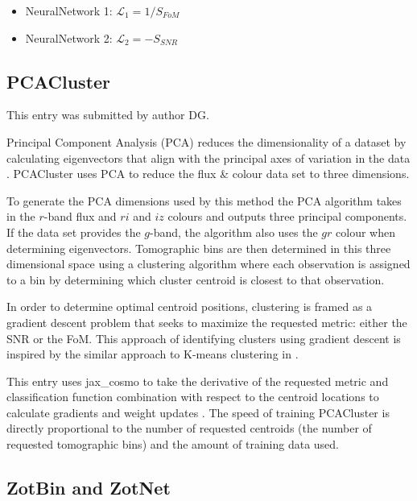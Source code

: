 \documentclass[twocolumn,twocolappendix]{aastex63}
\begin{document}
\begin{itemize}
	\item NeuralNetwork 1: $\mathcal{L}_1 = 1 / S_{FoM}$
	\item NeuralNetwork 2: $\mathcal{L}_2 = - S_{SNR} $
\end{itemize}  




\subsection{ {\sc PCACluster} }
This entry was submitted by author DG.

Principal Component Analysis (PCA) reduces the dimensionality of a dataset by
calculating eigenvectors that align with the principal axes of variation in the
data \citep{doi:10.1098}. {\sc PCACluster} uses PCA to reduce the flux \& colour
data set to three dimensions. 

To generate the PCA dimensions used by this method the PCA algorithm takes in
the $r$-band flux and $ri$ and $iz$ colours and outputs three principal
components.  If the data set provides the $g$-band, the algorithm also uses the
$gr$ colour when determining eigenvectors. Tomographic bins are then determined
in this three dimensional space using a clustering algorithm where each
observation is assigned to a bin by determining which cluster centroid is
closest to that observation.

In order to determine optimal centroid positions, clustering is framed as a
gradient descent problem that seeks to maximize the requested metric: either the
SNR or the FoM. This approach of identifying clusters using gradient descent is
inspired by the similar approach to K-means clustering in
\citet{NIPS1994_a1140a3d}.

This entry uses {\sc jax\_cosmo} to take the derivative of the requested metric
and classification function combination with respect to the centroid locations
to calculate gradients and weight updates \citep{jax-cosmo}.  The speed of
training PCACluster is directly proportional to the number of requested
centroids (the number of requested tomographic bins) and the amount of training
data used.






\subsection{ {\sc ZotBin and ZotNet} } \label{sec:zot}
\end{document}
